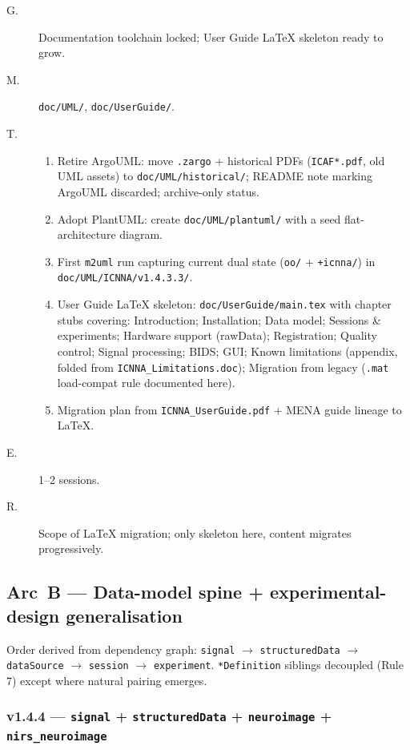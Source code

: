 \documentclass[11pt,a4paper]{article}
\begin{document}
\begin{description}
    \item[G.] Documentation toolchain locked; User Guide LaTeX skeleton ready to grow.
    \item[M.] \texttt{doc/UML/}, \texttt{doc/UserGuide/}.
    \item[T.]
        \begin{enumerate}[nosep]
            \item Retire ArgoUML: move \texttt{.zargo} + historical PDFs (\texttt{ICAF*.pdf}, old UML assets) to \texttt{doc/UML/historical/}; README note marking ArgoUML discarded; archive-only status.
            \item Adopt PlantUML: create \texttt{doc/UML/plantuml/} with a seed flat-architecture diagram.
            \item First \texttt{m2uml} run capturing current dual state (\texttt{oo/} + \texttt{+icnna/}) in \texttt{doc/UML/ICNNA/v1.4.3.3/}.
            \item User Guide LaTeX skeleton: \texttt{doc/UserGuide/main.tex} with chapter stubs covering: Introduction; Installation; Data model; Sessions \& experiments; Hardware support (rawData); Registration; Quality control; Signal processing; BIDS; GUI; Known limitations (appendix, folded from \texttt{ICNNA\_Limitations.doc}); Migration from legacy (\texttt{.mat} load-compat rule documented here).
            \item Migration plan from \texttt{ICNNA\_UserGuide.pdf} + MENA guide lineage to LaTeX.
        \end{enumerate}
    \item[E.] 1--2 sessions.
    \item[R.] Scope of LaTeX migration; only skeleton here, content migrates progressively.
\end{description}

\subsection{Arc~B --- Data-model spine + experimental-design generalisation}

Order derived from dependency graph: \texttt{signal} $\to$ \texttt{structuredData} $\to$ \texttt{dataSource} $\to$ \texttt{session} $\to$ \texttt{experiment}. \texttt{*Definition} siblings decoupled (Rule 7) except where natural pairing emerges.

\subsubsection*{v1.4.4 --- \texttt{signal} + \texttt{structuredData} + \texttt{neuroimage} + \texttt{nirs\_neuroimage}}
\end{document}
